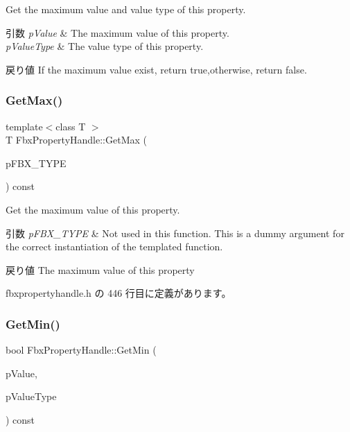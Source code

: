 Get the maximum value and value type of this property. 
\begin{DoxyParams}{引数}
{\em p\+Value} & The maximum value of this property. \\
\hline
{\em p\+Value\+Type} & The value type of this property. \\
\hline
\end{DoxyParams}
\begin{DoxyReturn}{戻り値}
If the maximum value exist, return true,otherwise, return false. 
\end{DoxyReturn}
\mbox{\label{class_fbx_property_handle_a170bbeb8c9dc5a4a1a1de93a9328f897}} 
\subsubsection{\texorpdfstring{Get\+Max()}{GetMax()}\hspace{0.1cm}{\footnotesize\ttfamily [2/2]}}
{\footnotesize\ttfamily template$<$class T $>$ \\
T Fbx\+Property\+Handle\+::\+Get\+Max (\begin{DoxyParamCaption}\item[{const T $\ast$}]{p\+F\+B\+X\+\_\+\+T\+Y\+PE }\end{DoxyParamCaption}) const\hspace{0.3cm}{\ttfamily [inline]}}

Get the maximum value of this property. 
\begin{DoxyParams}{引数}
{\em p\+F\+B\+X\+\_\+\+T\+Y\+PE} & Not used in this function. This is a dummy argument for the correct instantiation of the templated function. \\
\hline
\end{DoxyParams}
\begin{DoxyReturn}{戻り値}
The maximum value of this property 
\end{DoxyReturn}


 fbxpropertyhandle.\+h の 446 行目に定義があります。

\mbox{\label{class_fbx_property_handle_a722440b0f9ee5b206e38fe06c375ec4d}} 
\subsubsection{\texorpdfstring{Get\+Min()}{GetMin()}\hspace{0.1cm}{\footnotesize\ttfamily [1/2]}}
{\footnotesize\ttfamily bool Fbx\+Property\+Handle\+::\+Get\+Min (\begin{DoxyParamCaption}\item[{void $\ast$}]{p\+Value,  }\item[{\hyperlink{fbxpropertytypes_8h_a73913a5ddfb20e57c6f25e9e6784bd92}{E\+Fbx\+Type}}]{p\+Value\+Type }\end{DoxyParamCaption}) const}

